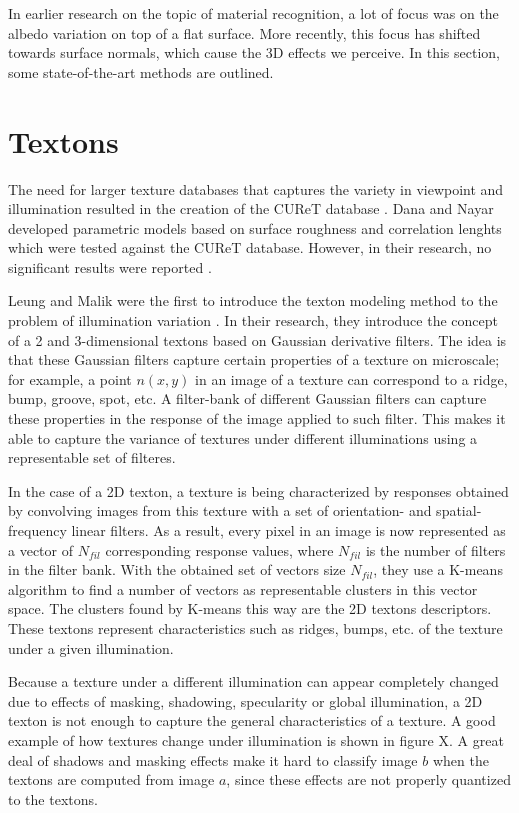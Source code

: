 \hypertarget{RelatedWork}{
}
In earlier research on the topic of material recognition, a lot of focus was on the albedo variation on top of a flat surface. More recently, this focus has shifted towards surface normals, which cause the 3D effects we perceive. In this section, some state-of-the-art methods are outlined.

\section{Textons}\label{sec:Textons}

The need for larger texture databases that captures the variety in viewpoint and illumination resulted in the creation of the CUReT database \cite{DanaNayar}. Dana and Nayar developed parametric models based on surface roughness and correlation lenghts which were tested against the CUReT database. However, in their research, no significant results were reported \cite{VarmaZisserman}.

Leung and Malik were the first to introduce the texton modeling method to the problem of illumination variation \cite{LeungMalik}. In their research, they introduce the concept of a 2 and 3-dimensional textons based on Gaussian derivative filters. The idea is that these Gaussian filters capture certain properties of a texture on microscale; for example, a point $n(x,y)$ in an image of a texture can correspond to a ridge, bump, groove, spot, etc. A filter-bank of different Gaussian filters can capture these properties in the response of the image applied to such filter.  This makes it able to capture the variance of textures under different illuminations using a representable set of filteres.

In the case of a 2D texton, a texture is being characterized by responses obtained by convolving images from this texture with a set of orientation- and spatial-frequency linear filters. As a result, every pixel in an image is now represented as a vector of $N_{fil}$ corresponding response values, where $N_{fil}$ is the number of filters in the filter bank. With the obtained set of vectors size $N_{fil}$, they use a K-means algorithm to find a number of vectors as representable clusters in this vector space. The clusters found by K-means this way are the 2D textons descriptors. These textons represent characteristics such as ridges, bumps, etc. of the texture under a given illumination.

Because a texture under a different illumination can appear completely changed due to effects of masking, shadowing, specularity or global illumination, a 2D texton is not enough to capture the general characteristics of a texture. A good example of how textures change under illumination is shown in figure X. A great deal of shadows and masking effects make it hard to classify image $b$ when the textons are computed from image $a$, since these effects are not properly quantized to the textons. 


